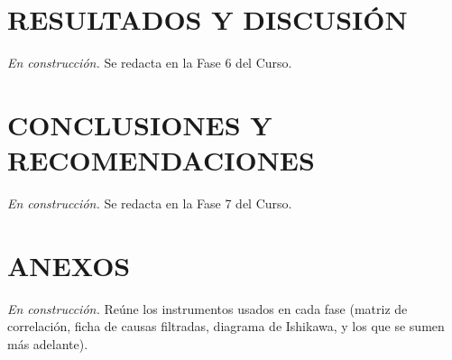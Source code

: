 
\section{RESULTADOS Y DISCUSIÓN}
\textit{En construcción.} Se redacta en la Fase 6 del Curso.

\section{CONCLUSIONES Y RECOMENDACIONES}
\textit{En construcción.} Se redacta en la Fase 7 del Curso.

\section*{ANEXOS}
\textit{En construcción.} Reúne los instrumentos usados en cada fase (matriz de correlación, ficha de causas filtradas, diagrama de Ishikawa, y los que se sumen más adelante).